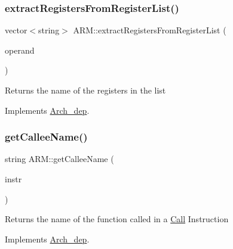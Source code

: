 \subsubsection{\texorpdfstring{extract\+Registers\+From\+Register\+List()}{extractRegistersFromRegisterList()}}
{\footnotesize\ttfamily vector$<$string$>$ A\+R\+M\+::extract\+Registers\+From\+Register\+List (\begin{DoxyParamCaption}\item[{const string \&}]{operand }\end{DoxyParamCaption})\hspace{0.3cm}{\ttfamily [virtual]}}

Returns the name of the registers in the list 

Implements \hyperlink{classArch__dep_afac73b40e179fbab3fc0954aa060548f}{Arch\+\_\+dep}.

\mbox{\label{classARM_aefb97cfd945153e713c1303e467f9190}} 
\subsubsection{\texorpdfstring{get\+Callee\+Name()}{getCalleeName()}}
{\footnotesize\ttfamily string A\+R\+M\+::get\+Callee\+Name (\begin{DoxyParamCaption}\item[{const \hyperlink{classObjdumpInstruction}{Objdump\+Instruction} \&}]{instr }\end{DoxyParamCaption})\hspace{0.3cm}{\ttfamily [virtual]}}

Returns the name of the function called in a \hyperlink{classCall}{Call} Instruction 

Implements \hyperlink{classArch__dep_ad09e79609dda858cdbd651064623ae2b}{Arch\+\_\+dep}.

\mbox{\label{classARM_a4434e1ab868a4d3a26940aaec3366dd0}} 
